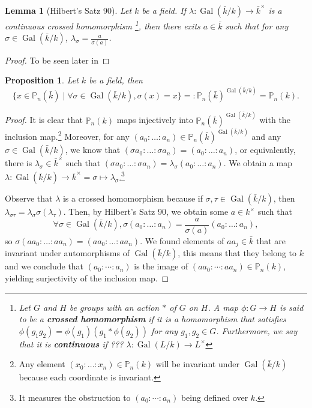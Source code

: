 \documentclass{tufte-handout} %
\newtheorem{prop}[thm]{Proposition}
\newtheorem{lem}[thm]{Lemma}
\theoremstyle{definition}
\theoremstyle{remark}
\renewcommand{\P}{\mathbb{P}}
\DeclareMathOperator{\gal}{Gal}
\begin{document}
\begin{lem}[Hilbert's Satz 90]
	 Let $k$ be a field. If $\lambda: \gal(\bar{k}/k) \rightarrow \bar{k}^{\times}$ is a continuous crossed homomorphism \footnote{Let $G$ and $H$ be groups with an action $*$ of $G$ on $H$. A map $\phi: G \rightarrow H$ is said to be a \textbf{crossed homomorphism} if it is a homomorphism that satisfies $\phi(g_1g_2) = \phi(g_1)(g_1 *\phi(g_2))$ for any $g_1,g_2 \in G$. Furthermore, we say that it is \textbf{continuous} if ??? %
	 	 $\lambda: \gal(L/k) \rightarrow L^{\times}$}, then there exits $a \in \bar{k}$ such that for any $\sigma \in\gal(\bar{k}/k)$, $\lambda_{\sigma} = \frac{a}{\sigma(a)}$.
\end{lem}
\begin{proof}
	To be seen later in %
\end{proof}
\begin{prop}
	Let $k$ be a field, then
	\[\{x \in \P_n(\bar{k}) \mid \forall \sigma \in \gal(\bar{k}/k), \sigma(x) = x\} =: \P_n(\bar{k})^{\gal(\bar{k}/k)} = \P_n(k).\]
\end{prop}
\begin{proof}
	It is clear that $\P_n(k)$ maps injectively into $\P_n(\bar{k})^{\gal(\bar{k}/k)}$ with the inclusion map.\footnote{Any element $(x_0: \dots :x_n) \in \P_n(k)$ will be invariant under $\gal(\bar{k}/k)$ because each coordinate is invariant.} Moreover, for any $(a_0: \dots : a_n) \in \P_n(\bar{k})^{\gal(\bar{k}/k)}$ and any $\sigma \in \gal(\bar{k}/k)$, we know that $(\sigma a_0: \dots : \sigma a_n) = (a_0:\dots : a_n)$, or equivalently, there is $\lambda_{\sigma} \in \bar{k}^{\times}$ such that $(\sigma a_0: \dots : \sigma a_n) = \lambda_{\sigma}(a_0:\dots : a_n)$. We obtain a map $\lambda: \gal(\bar{k}/k) \rightarrow \bar{k}^{\times} = \sigma \mapsto \lambda_{\sigma}$.\footnote{It measures the obstruction to $(a_0: \cdots : a_n)$ being defined over $k$.%
	}
	
	Observe that $\lambda$ is a crossed homomorphism because if $\sigma, \tau \in \gal(\bar{k}/k)$, then $\lambda_{\sigma\tau} = \lambda_{\sigma}\sigma(\lambda_{\tau})$. %
	Then, by Hilbert's Satz 90, we obtain some $a \in k^{\times}$ such that \[\forall\sigma \in \gal(\bar{k}/k),\sigma(a_0: \dots: a_n)  = \frac{a}{\sigma(a)} (a_0: \dots: a_n),\] so $\sigma(aa_0: \dots: aa_n) = (aa_0: \dots: aa_n)$. We found elements of $aa_j \in \bar{k}$ that are invariant under automorphisms of $\gal(\bar{k}/k)$, this means that they belong to $k$ and we conclude that $(a_0: \cdots: a_n)$ is the image of $(aa_0 : \cdots : aa_n) \in \P_n(k)$, yielding surjectivity of the inclusion map.
\end{proof}
\end{document}
